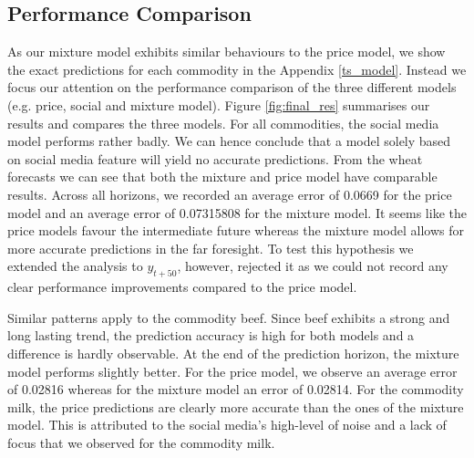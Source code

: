 \subsection{Performance Comparison}


As our mixture model exhibits similar behaviours to the price model, we show the exact predictions for each commodity in the Appendix \ref{ts_model}. Instead we focus our attention on the performance comparison of the three different models (e.g. price, social and mixture model). Figure \ref{fig:final_res} summarises our results and compares the three models. For all commodities, the social media model performs rather badly. We can hence conclude that a model solely based on social media feature will yield no accurate predictions.  From the wheat forecasts we can see that both the mixture and price model have comparable results. Across all horizons, we recorded an average error of 0.0669 for the price model and an average error of 0.07315808 for the mixture model. It seems like the price models favour the intermediate future whereas the mixture model allows for more accurate predictions in the far foresight. To test this hypothesis we extended the analysis to $y_{t+50}$, however, rejected it as we could not record any clear performance improvements compared to the price model.  

Similar patterns apply to the commodity beef. Since beef exhibits a strong and long lasting trend, the prediction accuracy is high for both models and a difference is hardly observable. At the end of the prediction horizon, the mixture model performs slightly better. For the price model, we observe an average error of 0.02816 whereas for the mixture model an error of 0.02814. For the commodity milk, the price predictions are clearly more accurate than the ones of the mixture model. This is attributed to the social media's high-level of noise and a lack of focus that we observed for the commodity milk.  






